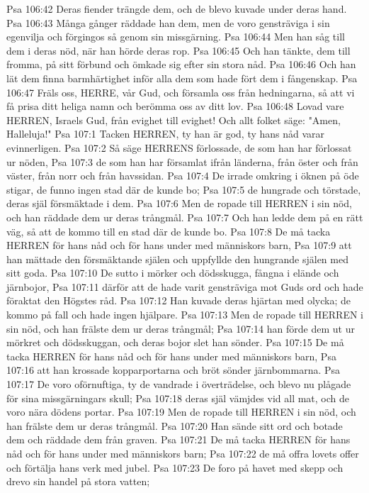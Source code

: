 Psa 106:42  Deras fiender trängde dem, och de blevo kuvade under deras hand.
Psa 106:43  Många gånger räddade han dem, men de voro gensträviga i sin egenvilja och förgingos så genom sin missgärning.
Psa 106:44  Men han såg till dem i deras nöd, när han hörde deras rop.
Psa 106:45  Och han tänkte, dem till fromma, på sitt förbund och ömkade sig efter sin stora nåd.
Psa 106:46  Och han lät dem finna barmhärtighet inför alla dem som hade fört dem i fångenskap.
Psa 106:47  Fräls oss, HERRE, vår Gud, och församla oss från hedningarna, så att vi få prisa ditt heliga namn och berömma oss av ditt lov.
Psa 106:48  Lovad vare HERREN, Israels Gud, från evighet till evighet! Och allt folket säge: "Amen, Halleluja!"
Psa 107:1  Tacken HERREN, ty han är god, ty hans nåd varar evinnerligen.
Psa 107:2  Så säge HERRENS förlossade, de som han har förlossat ur nöden,
Psa 107:3  de som han har församlat ifrån länderna, från öster och från väster, från norr och från havssidan.
Psa 107:4  De irrade omkring i öknen på öde stigar, de funno ingen stad där de kunde bo;
Psa 107:5  de hungrade och törstade, deras själ försmäktade i dem.
Psa 107:6  Men de ropade till HERREN i sin nöd, och han räddade dem ur deras trångmål.
Psa 107:7  Och han ledde dem på en rätt väg, så att de kommo till en stad där de kunde bo.
Psa 107:8  De må tacka HERREN för hans nåd och för hans under med människors barn,
Psa 107:9  att han mättade den försmäktande själen och uppfyllde den hungrande själen med sitt goda.
Psa 107:10  De sutto i mörker och dödsskugga, fångna i elände och järnbojor,
Psa 107:11  därför att de hade varit gensträviga mot Guds ord och hade föraktat den Högstes råd.
Psa 107:12  Han kuvade deras hjärtan med olycka; de kommo på fall och hade ingen hjälpare.
Psa 107:13  Men de ropade till HERREN i sin nöd, och han frälste dem ur deras trångmål;
Psa 107:14  han förde dem ut ur mörkret och dödsskuggan, och deras bojor slet han sönder.
Psa 107:15  De må tacka HERREN för hans nåd och för hans under med människors barn,
Psa 107:16  att han krossade kopparportarna och bröt sönder järnbommarna.
Psa 107:17  De voro oförnuftiga, ty de vandrade i överträdelse, och blevo nu plågade för sina missgärningars skull;
Psa 107:18  deras själ vämjdes vid all mat, och de voro nära dödens portar.
Psa 107:19  Men de ropade till HERREN i sin nöd, och han frälste dem ur deras trångmål.
Psa 107:20  Han sände sitt ord och botade dem och räddade dem från graven.
Psa 107:21  De må tacka HERREN för hans nåd och för hans under med människors barn;
Psa 107:22  de må offra lovets offer och förtälja hans verk med jubel.
Psa 107:23  De foro på havet med skepp och drevo sin handel på stora vatten;
